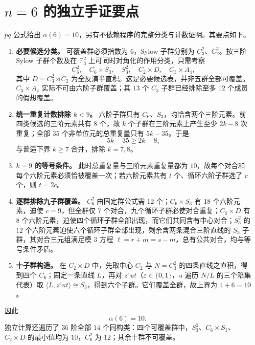 \documentclass[11pt,a4paper]{article}
\numberwithin{equation}{section}
\theoremstyle{plain}
\theoremstyle{definition}
\theoremstyle{remark}
\newcommand{\F}{\mathbb{F}}
\begin{document}
\section{\texorpdfstring{$n=6$}{n=6} 的独立手证要点}\label{sec:n6}
$pq$ 公式给出 $\alpha(6)=10$，另有不依赖程序的完整分类与计数证明。其要点如下。
\begin{enumerate}[label=\textup{(\arabic*)},leftmargin=2.6em]
 \item \textbf{必要候选分类。} 可覆盖群必须指数为 $6$，Sylow 子群分别为 $C_3^2$、$C_2^2$。按三阶 Sylow 子群个数及在 $\F_3^2$ 上可同时对角化的作用分类，只需考察
 \begin{equation}
 C_6^2,\quad C_6\times S_3,\quad S_3^2,\quad C_2\times D,\quad C_3\times A_4,
 \end{equation}
 其中 $D=C_3^2\rtimes C_2$ 为全反演半直积。这是必要候选表，并非五群全部可覆盖。$C_3\times A_4$ 实际不可由六阶子群覆盖；其 $13$ 个 $C_3$ 子群已经排除至多 $12$ 个成员的假想覆盖。
 \item \textbf{统一重复计数排除 $k<9$。} 六阶子群只有 $C_6$、$S_3$，均恰含两个三阶元素。前四类候选的三阶元素共有 $8$ 个，故 $k$ 个子群在三阶元素上产生至少 $2k-8$ 次重复；全部 $35$ 个非单位元的总重复量只有 $5k-35$。于是
 \begin{equation}
 5k-35\ge2k-8,
 \end{equation}
 与普适下界 $k\ge7$ 合并，排除 $k=7,8$。
 \item \textbf{$k=9$ 的等号条件。} 此时总重复量与三阶元素重复量都为 $10$，故每个对合和每个六阶元素必须恰被覆盖一次；若六阶元素共有 $t$ 个、循环六阶子群选了 $c$ 个，则 $t=2c$。
 \item \textbf{逐群排除九子群覆盖。} $C_6^2$ 由固定群公式需 $12$ 个；$C_6\times S_3$ 有 $18$ 个六阶元素，迫使 $c=9$，但全群仅 $7$ 个对合，九个循环子群必使对合重复；$C_2\times D$ 有 $8$ 个六阶元素，迫使四个循环子群全部出现，而它们共同含有中心对合；$S_3^2$ 的 $12$ 个六阶元素迫使六个循环子群全部出现，剩余含两条混合三阶直线的 $S_3$ 子群，其对合三元组满足模 $3$ 方程 $\ell=r+m=s-m$，总有公共对合，均与等号条件矛盾。
 \item \textbf{十子群构造。} 在 $C_2\times D$ 中，先取中心 $C_2$ 与 $N=C_3^2$ 的四条直线之直积，得到四个 $C_6$；固定一条直线 $L$，再对 $z^\varepsilon ut$（$\varepsilon\in\{0,1\}$，$u$ 遍历 $N/L$ 的三个陪集代表）取 $\langle L,z^\varepsilon ut\rangle\cong S_3$，得到六个子群。它们覆盖全群，故上界为 $4+6=10$。
\end{enumerate}
因此
\begin{equation}\label{eq:n6-exact}
 \boxed{\alpha(6)=10.}
\end{equation}
独立计算还遍历了 $36$ 阶全部 $14$ 个同构类：四个可覆盖群中，$S_3^2$、$C_6\times S_3$、$C_2\times D$ 的最小值均为 $10$，$C_6^2$ 为 $12$；其余十群不可覆盖。
\end{document}
